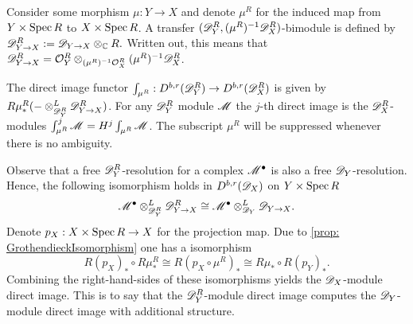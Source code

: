    Consider some morphism $\mu:Y\to X$ and denote $\mu^R$ for the induced map from $Y\times \operatorname{Spec} R$ to $X\times \operatorname{Spec} R$.
    A transfer $(\mathscr{D}_Y^R,(\mu^R)^{-1}\mathscr{D}_X^R)$-bimodule is defined by $\mathscr{D}_{Y\to X}^R:= \mathscr{D}_{Y\to X}\otimes_{\mathbb{C}} R .$ Written out, this means that $\mathscr{D}_{Y\to X}^R = \mathcal{O}_Y^R \otimes_{(\mu^R)^{-1}\mathcal{O}_X^R}(\mu^R)^{-1}\mathscr{D}_X^R$.
    \begin{definition}
      The direct image functor $\int_{\mu^R}:D^{b,r}(\mathscr{D}_Y^R)\to D^{b,r}(\mathscr{D}_X^R)$ is given by $R\mu^R_* ({-}\otimes_{\mathscr{D}_Y^R}^L \mathscr{D}_{Y\to X}^R)$.
      For any $\mathscr{D}_Y^R$ module $\mathscr{M}$ the $j$-th direct image is the $\mathscr{D}_X^R$-modules $\int^j_{\mu^R} \mathscr{M} = H^j \int_{\mu^R} \mathscr{M}$.
      The subscript $\mu^R$ will be suppressed whenever there is no ambiguity.
    \end{definition}
    Observe that a free $\mathscr{D}_Y^R$-resolution for a complex $\mathscr{M}^\bullet$ is also a free $\mathscr{D}_Y$-resolution.
    Hence, the following isomorphism holds in $D^{b,r}(\mathscr{D}_X)$ on $Y\times \operatorname{Spec} R$
    $$\mathscr{M}^\bullet \otimes_{\mathscr{D}_Y^R}^L \mathscr{D}_{Y\to X}^R \cong \mathscr{M}^\bullet \otimes_{\mathscr{D}_Y}^L \mathscr{D}_{Y\to X}.$$
    Denote $p_X:X\times \operatorname{Spec} R \to X$ for the projection map.
    Due to \cref{prop: GrothendieckIsomorphism} one has a isomorphism
    $$R(p_X)_* \circ R\mu^R_* \cong R(p_X \circ \mu^R)_* \cong R\mu_* \circ R(p_Y)_*.$$
    Combining the right-hand-sides of these isomorphisms yields the $\mathscr{D}_X$-module direct image.
    This is to say that the $\mathscr{D}_Y^R$-module direct image computes the $\mathscr{D}_Y$-module direct image with additional structure.

